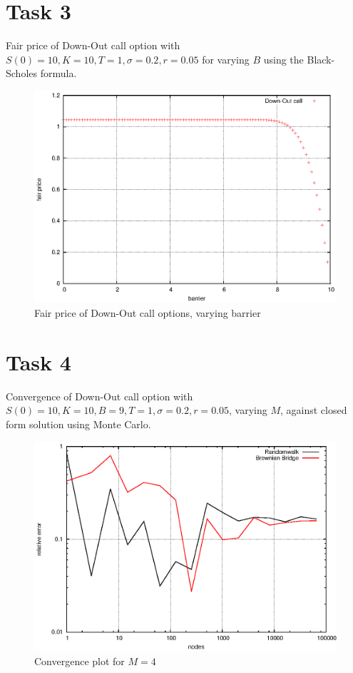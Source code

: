 \documentclass[]{article}
\begin{document}
\section*{Task 3}
Fair price of Down-Out call option with  $S(0)=10,K=10,T=1,\sigma=0.2,r=0.05$ for varying $B$ using the Black-Scholes formula.
\begin{figure}[!ht]
\centering
\includegraphics[width=.9\textwidth]{task3.eps}
\caption{Fair price of Down-Out call options, varying barrier}
\label{fig:Task3}
\end{figure}
\clearpage


\section*{Task 4}
Convergence of Down-Out call option with $S(0)=10,K=10,B=9,T=1,\sigma=0.2,r=0.05$, varying $M$, against closed form solution using Monte Carlo.
\begin{figure}[!ht]
\centering
\includegraphics[width=.9\textwidth]{task4_mc_4.eps}
\caption{Convergence plot for $M=4$}
\label{fig:Task4a}
\end{figure}
\end{document}
